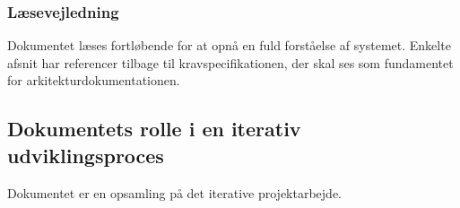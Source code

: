 \subsubsection{Læsevejledning}
Dokumentet læses fortløbende for at opnå en fuld forståelse af systemet. Enkelte afsnit har referencer tilbage til kravspecifikationen, der skal ses som fundamentet for arkitekturdokumentationen.

\subsection{Dokumentets rolle i en iterativ udviklingsproces}
Dokumentet er en opsamling på det iterative projektarbejde.